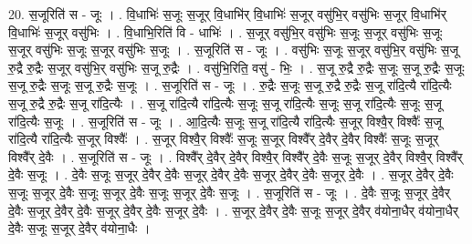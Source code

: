 \documentclass[17pt]{extarticle}
\begin{document}
20. स॒जूरिति॑ स - जूः । . वि॒धाभिः॑ स॒जूः स॒जूर् वि॒धाभि॑र् वि॒धाभिः॑ स॒जूर् वसु॑भि॒र् वसु॑भिः स॒जूर् वि॒धाभि॑र् वि॒धाभिः॑ स॒जूर् वसु॑भिः । . वि॒धाभि॒रिति॑ वि - धाभिः॑ । . स॒जूर् वसु॑भि॒र् वसु॑भिः स॒जूः स॒जूर् वसु॑भिः स॒जूः स॒जूर् वसु॑भिः स॒जूः स॒जूर् वसु॑भिः स॒जूः । . स॒जूरिति॑ स - जूः । . वसु॑भिः स॒जूः स॒जूर् वसु॑भि॒र् वसु॑भिः स॒जू रु॒द्रै रु॒द्रैः स॒जूर् वसु॑भि॒र् वसु॑भिः स॒जू रु॒द्रैः । . वसु॑भि॒रिति॒ वसु॑ - भिः॒ । . स॒जू रु॒द्रै रु॒द्रैः स॒जूः स॒जू रु॒द्रैः स॒जूः स॒जू रु॒द्रैः स॒जूः स॒जू रु॒द्रैः स॒जूः । . स॒जूरिति॑ स - जूः । . रु॒द्रैः स॒जूः स॒जू रु॒द्रै रु॒द्रैः स॒जू रा॑दि॒त्यै रा॑दि॒त्यैः स॒जू रु॒द्रै रु॒द्रैः स॒जू रा॑दि॒त्यैः । . स॒जू रा॑दि॒त्यै रा॑दि॒त्यैः स॒जूः स॒जू रा॑दि॒त्यैः स॒जूः स॒जू रा॑दि॒त्यैः स॒जूः स॒जू रा॑दि॒त्यैः स॒जूः । . स॒जूरिति॑ स - जूः । . आ॒दि॒त्यैः स॒जूः स॒जू रा॑दि॒त्यै रा॑दि॒त्यैः स॒जूर् विश्वै॒र् विश्वैः᳚ स॒जू रा॑दि॒त्यै रा॑दि॒त्यैः स॒जूर् विश्वैः᳚ । . स॒जूर् विश्वै॒र् विश्वैः᳚ स॒जूः स॒जूर् विश्वै᳚र् दे॒वैर् दे॒वैर् विश्वैः᳚ स॒जूः स॒जूर् विश्वै᳚र् दे॒वैः । . स॒जूरिति॑ स - जूः । . विश्वै᳚र् दे॒वैर् दे॒वैर् विश्वै॒र् विश्वै᳚र् दे॒वैः स॒जूः स॒जूर् दे॒वैर् विश्वै॒र् विश्वै᳚र् दे॒वैः स॒जूः । . दे॒वैः स॒जूः स॒जूर् दे॒वैर् दे॒वैः स॒जूर् दे॒वैर् दे॒वैः स॒जूर् दे॒वैर् दे॒वैः स॒जूर् दे॒वैः । . स॒जूर् दे॒वैर् दे॒वैः स॒जूः स॒जूर् दे॒वैः स॒जूः स॒जूर् दे॒वैः स॒जूः स॒जूर् दे॒वैः स॒जूः । . स॒जूरिति॑ स - जूः । . दे॒वैः स॒जूः स॒जूर् दे॒वैर् दे॒वैः स॒जूर् दे॒वैर् दे॒वैः स॒जूर् दे॒वैर् दे॒वैः स॒जूर् दे॒वैः । . स॒जूर् दे॒वैर् दे॒वैः स॒जूः स॒जूर् दे॒वैर् व॑योना॒धैर् व॑योना॒धैर् दे॒वैः स॒जूः स॒जूर् दे॒वैर् व॑योना॒धैः । \newline
\end{document}
